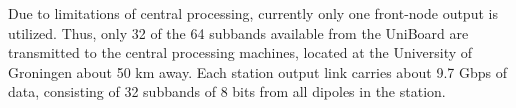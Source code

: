 \documentclass{ws-jai}
\begin{document}
Due to limitations  of central processing, currently only  one front-node output
is utilized. Thus,  only 32 of the  64 subbands available from  the UniBoard are
transmitted to  the central  processing machines, located  at the  University of
Groningen about 50 km away.  Each station  output link carries about 9.7 Gbps of
data, consisting of 32 subbands of 8 bits from all dipoles in the station.\\


\end{document}
